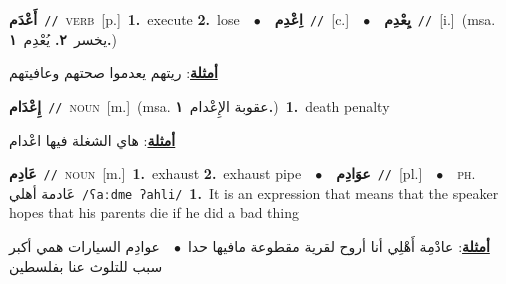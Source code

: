 \documentclass[10pt,a4paper,twoside]{article} %
\begin{document}
\begin{multicols}{2}
{\setlength\topsep{0pt}\textbf{\foreignlanguage{arabic}{أَعْدَم}}\ {\color{gray}\texttt{//}\color{black}}\ \textsc{verb}\ [p.]\ \textbf{1.}~execute  \textbf{2.}~lose\ \ $\bullet$\ \ \setlength\topsep{0pt}\textbf{\foreignlanguage{arabic}{اِعْدِم}}\ {\color{gray}\texttt{//}\color{black}}\ [c.]\ \ $\bullet$\ \ \setlength\topsep{0pt}\textbf{\foreignlanguage{arabic}{يِعْدِم}}\ {\color{gray}\texttt{//}\color{black}}\ [i.]\ \color{gray}(msa. \foreignlanguage{arabic}{يخسر}~\foreignlanguage{arabic}{\textbf{٢.}}  \foreignlanguage{arabic}{يُعْدِم}~\foreignlanguage{arabic}{\textbf{١.}})\color{black}\  \begin{flushright}\color{gray}\foreignlanguage{arabic}{\textbf{\underline{\foreignlanguage{arabic}{أمثلة}}}: ريتهم يعدموا صحتهم وعافيتهم}\end{flushright}\color{black}} \vspace{2mm}

{\setlength\topsep{0pt}\textbf{\foreignlanguage{arabic}{إِعْدَام}}\ {\color{gray}\texttt{//}\color{black}}\ \textsc{noun}\ [m.]\ \color{gray}(msa. \foreignlanguage{arabic}{عقوبة الإِعْدام}~\foreignlanguage{arabic}{\textbf{١.}})\color{black}\ \textbf{1.}~death penalty\  \begin{flushright}\color{gray}\foreignlanguage{arabic}{\textbf{\underline{\foreignlanguage{arabic}{أمثلة}}}: هاي الشغلة فيها اعْدام}\end{flushright}\color{black}} \vspace{2mm}

{\setlength\topsep{0pt}\textbf{\foreignlanguage{arabic}{عَادِم}}\ {\color{gray}\texttt{//}\color{black}}\ \textsc{noun}\ [m.]\ \textbf{1.}~exhaust  \textbf{2.}~exhaust pipe\ \ $\bullet$\ \ \setlength\topsep{0pt}\textbf{\foreignlanguage{arabic}{عوَادِم}}\ {\color{gray}\texttt{//}\color{black}}\ [pl.]\ \ $\bullet$\ \ \textsc{ph.} \color{gray} \foreignlanguage{arabic}{عَادمة أهلي}\color{black}\ {\color{gray}\texttt{/{\sffamily ʕaːdme ʔahli}/}\color{black}}\ \textbf{1.}~It is an expression that means that the speaker hopes that his parents die if he did a bad thing\  \begin{flushright}\color{gray}\foreignlanguage{arabic}{\textbf{\underline{\foreignlanguage{arabic}{أمثلة}}}: عادْمِة أَهْلِي أنا أروح لقرية مقطوعة مافيها حدا\ $\bullet$\ \  عوادِم السيارات همي أكبر سبب للتلوث عنا بفلسطين}\end{flushright}\color{black}} \vspace{2mm}


\end{multicols}
\end{document}
